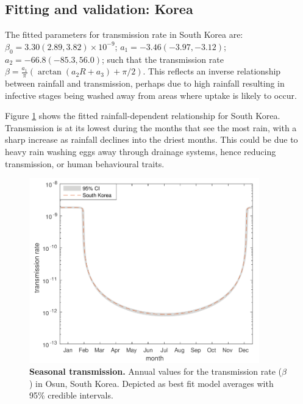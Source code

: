\subsection{Fitting and validation: Korea}

The fitted parameters for transmission rate in South Korea are: $\beta_0 = 3.30 (2.89,3.82)\times10^{-9}$; $a_1 = -3.46(-3.97,-3.12)$; $a_2 = -66.8(-85.3,56.0)$; such that the transmission rate $\beta= \frac{a_1}{\pi}(\arctan(a_2R+a_3)+\pi/2)$.  This reflects an inverse relationship between rainfall and transmission, perhaps due to high rainfall resulting in infective stages being washed away from areas where uptake is likely to occur.

Figure \ref{Fig7} shows the fitted rainfall-dependent relationship for South Korea. Transmission is at its lowest during the months that see the most rain, with a sharp increase as rainfall declines into the driest months. This could be due to heavy rain washing eggs away through drainage systems, hence reducing transmission, or human behavioural traits.

\begin{figure}[!h]
\begin{center}
\includegraphics[height=8cm]{Project/Figures/STH/Fig7.pdf}
\caption{{\bf Seasonal transmission.}
Annual values for the transmission rate ($\beta$) in Osun, South Korea. Depicted as best fit model averages with 95\% credible intervals.}
\label{Fig7}
\end{center}
\end{figure} 

